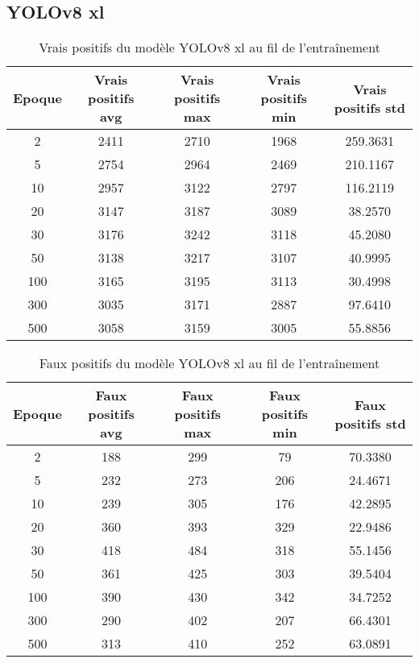 
\clearpage
\subsection{YOLOv8 xl}

\begin{table}[!ht]
    \caption{Vrais positifs du modèle YOLOv8 xl au fil de l'entraînement}
    \label{tab:yolov8xl_true_positive}
    \centering
    \begin{tabular}{ |c||c|c|c|c|  }
        \hline
        \rowcolor{gray!50}
        Epoque & Vrais positifs avg & Vrais positifs max & Vrais positifs min & Vrais positifs std\\
        \hline
        2 & 2411 & 2710 & 1968 & 259.3631\\
        5 & 2754 & 2964 & 2469 & 210.1167\\
        10 & 2957 & 3122 & 2797 & 116.2119\\
        20 & 3147 & 3187 & 3089 & 38.2570\\
        30 & 3176 & 3242 & 3118 & 45.2080\\
        50 & 3138 & 3217 & 3107 & 40.9995\\
        100 & 3165 & 3195 & 3113 & 30.4998\\
        300 & 3035 & 3171 & 2887 & 97.6410\\
        500 & 3058 & 3159 & 3005 & 55.8856\\
        \hline
    \end{tabular}
\end{table}

\begin{table}[!ht]
    \caption{Faux positifs du modèle YOLOv8 xl au fil de l'entraînement}
    \label{tab:yolov8xl_false_positive}
    \centering
    \begin{tabular}{ |c||c|c|c|c|  }
        \hline
        \rowcolor{gray!50}
        Epoque & Faux positifs avg & Faux positifs max & Faux positifs min & Faux positifs std\\
        \hline
        2 & 188 & 299 & 79 & 70.3380\\
        5 & 232 & 273 & 206 & 24.4671\\
        10 & 239 & 305 & 176 & 42.2895\\
        20 & 360 & 393 & 329 & 22.9486\\
        30 & 418 & 484 & 318 & 55.1456\\
        50 & 361 & 425 & 303 & 39.5404\\
        100 & 390 & 430 & 342 & 34.7252\\
        300 & 290 & 402 & 207 & 66.4301\\
        500 & 313 & 410 & 252 & 63.0891\\
        \hline
    \end{tabular}
\end{table}

